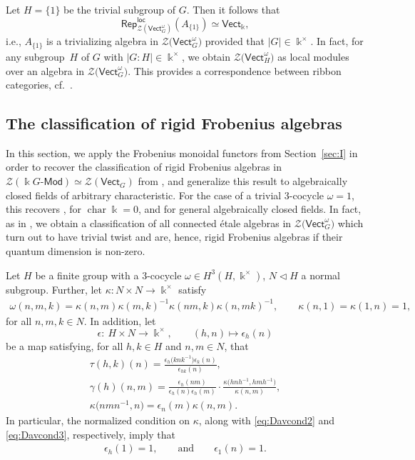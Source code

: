 \documentclass[pdftex]{sigma}
\numberwithin{equation}{section}
\newcommand{\lmod}[1]{#1\text{-}\mathsf{Mod}}
\newcommand{\cha}{\operatorname{char}}
\newcommand{\locmod}{\mathsf{Rep}^{\mathsf{loc}}}
\newcommand{\Vect}{\mathsf{Vect}}
\newcommand{\cZ}{\mathcal{Z}}
\begin{document}
\begin{Example}
Let $H=\{1\}$ be the trivial subgroup of $G$. Then it follows that \[\locmod_{\cZ(\Vect_G^\omega)}(A_{\{1\}})\simeq \Vect_{\Bbbk},\]
i.e., $A_{\{1\}}$ is a trivializing algebra in $\cZ\big(\Vect_G^\omega\big)$ provided that $|G|\in \Bbbk^\times$. In fact, for any subgroup~$H$ of $G$ with $|G:H|\in \Bbbk^\times$, we obtain $\cZ\big(\Vect_H^\omega\big)$ as local modules over an algebra in $\cZ\big(\Vect_G^\omega\big)$. This provides a correspondence between ribbon categories, cf.\ \cite[Section~1.4]{FFRS}.
\end{Example}



\subsection{The classification of rigid Frobenius algebras}

In this section, we apply the Frobenius monoidal functors from Section~\ref{sec:I} in order to recover the classification of rigid Frobenius algebras in $\cZ(\lmod{\Bbbk G})\simeq \cZ(\Vect_G)$ from \cite[Theorem 3.15]{DS}, and generalize this result to algebraically closed fields of arbitrary characteristic. For the case of a trivial $3$-cocycle $\omega=1$, this recovers \cite[Theorem~3.5.1]{Dav3}, for $\cha \Bbbk=0$, and \cite[Theorem~6.14]{LW3} for general algebraically closed fields. In fact, as in \cite{DS}, we obtain a classification of all connected \'etale algebras in $\cZ\big(\Vect_G^\omega\big)$ which turn out to have trivial twist and are, hence, rigid Frobenius algebras if their quantum dimension is non-zero.

\begin{Notation} \label{not:cocycledata}
Let $H$ be a finite group with a $3$-cocycle $\omega\in H^3(H,\Bbbk^\times)$, $N\triangleleft H$ a normal subgroup.
Further, let $\kappa \colon N\times N\to \Bbbk^\times$ satisfy
\begin{align}\label{eq:tau}
 \omega(n,m,k) =\kappa(n,m)\kappa(m,k)^{-1}\kappa(nm,k)\kappa(n,mk)^{-1}, \qquad \kappa(n,1)=\kappa(1,n)=1,
\end{align}
for all $n,m,k\in N$. In addition, let
\[\epsilon\colon\ H\times N\to \Bbbk^\times, \qquad (h,n)\mapsto \epsilon_h(n)\]
be a map satisfying, for all $h,k\in H$ and $n,m\in N$, that
\begin{gather}
 \tau(h,k)(n)=\frac{\epsilon_h\big(knk^{-1}\big)\epsilon_k(n)}{\epsilon_{hk}(n)}, \label{eq:Davcond1}\\
 \gamma(h)(n,m)=\frac{\epsilon_h(nm)}{\epsilon_h(n)\epsilon_h(m)}\cdot\frac{\kappa\big(hnh^{-1},hmh^{-1}\big)}{\kappa(n,m)}, \label{eq:Davcond2}\\
 \kappa\big(nmn^{-1},n\big)=\epsilon_n(m)\kappa(n,m).
 \label{eq:Davcond3}
\end{gather}
In particular, the normalized condition on $\kappa$, along with \eqref{eq:Davcond2} and \eqref{eq:Davcond3}, respectively, imply that
\begin{align*}
 \epsilon_{h}(1) = 1, \qquad \text{and} \qquad \epsilon_{1}(n) = 1. %
\end{align*}
\end{Notation}
\end{document}
